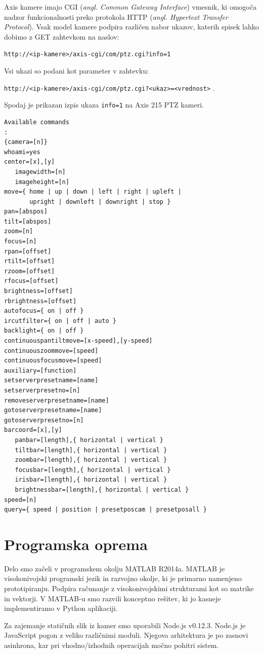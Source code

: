 \documentclass[a4paper, 12pt]{book}
\begin{document}
Axis kamere imajo CGI (\emph{angl. Common Gateway Interface}) vmesnik, ki omogoča nadzor funkcionalnosti preko protokola HTTP (\emph{angl. Hypertext Transfer Protocol}). Vsak model kamere podpira različen nabor ukazov, katerih spisek lahko dobimo z GET zahtevkom na naslov:
\begin{center}
\texttt{http://<ip-kamere>/axis-cgi/com/ptz.cgi?info=1}
\end{center}
Vsi ukazi so podani kot parameter v zahtevku:
\begin{center}
\texttt{http://<ip-kamere>/axis-cgi/com/ptz.cgi?<ukaz>=<vrednost>} .
\end{center}
Spodaj je prikazan izpis ukaza \texttt{info=1} na Axis 215 PTZ kameri.
\begin{lstlisting}
Available commands
:
{camera=[n]}
whoami=yes
center=[x],[y]
   imagewidth=[n]
   imageheight=[n]
move={ home | up | down | left | right | upleft | 
	   upright | downleft | downright | stop }
pan=[abspos]
tilt=[abspos]
zoom=[n]
focus=[n]
rpan=[offset]
rtilt=[offset]
rzoom=[offset]
rfocus=[offset]
brightness=[offset]
rbrightness=[offset]
autofocus={ on | off }
ircutfilter={ on | off | auto }
backlight={ on | off }
continuouspantiltmove=[x-speed],[y-speed]
continuouszoommove=[speed]
continuousfocusmove=[speed]
auxiliary=[function]
setserverpresetname=[name]
setserverpresetno=[n]
removeserverpresetname=[name]
gotoserverpresetname=[name]
gotoserverpresetno=[n]
barcoord=[x],[y]
   panbar=[length],{ horizontal | vertical }
   tiltbar=[length],{ horizontal | vertical }
   zoombar=[length],{ horizontal | vertical }
   focusbar=[length],{ horizontal | vertical }
   irisbar=[length],{ horizontal | vertical }
   brightnessbar=[length],{ horizontal | vertical }
speed=[n]
query={ speed | position | presetposcam | presetposall }
\end{lstlisting}


\section{Programska oprema}
Delo smo začeli v programskem okolju MATLAB R2014a. MATLAB je visokonivojski programski jezik in razvojno okolje, ki je primarno namenjeno prototipiranju. Podpira računanje z visokonivojskimi strukturami kot so matrike in vektorji. V MATLAB-u smo razvili konceptno rešitev, ki jo kasneje implementiramo v Python aplikaciji. 

Za zajemanje statičnih slik iz kamer smo uporabili Node.js v0.12.3. Node.js je JavaScript pogon z veliko različnimi moduli. Njegova arhitektura je po zasnovi asinhrona, kar pri vhodno/izhodnih operacijah močno pohitri sistem.
\end{document}
